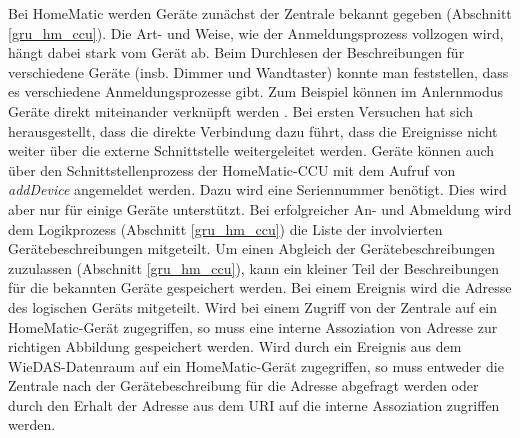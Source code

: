 Bei HomeMatic werden Geräte zunächst der Zentrale bekannt gegeben (Abschnitt \ref{gru_hm_ccu}).
Die Art- und Weise, wie der Anmeldungsprozess vollzogen wird, hängt dabei stark vom Gerät ab.
Beim Durchlesen der Beschreibungen für verschiedene Geräte (insb. Dimmer und Wandtaster)
konnte man feststellen, dass es verschiedene Anmeldungsprozesse gibt.
Zum Beispiel können im Anlernmodus Geräte direkt miteinander verknüpft werden \cite[Seite 6]{hmdimmer}.
Bei ersten Versuchen hat sich herausgestellt, dass die direkte Verbindung dazu führt, dass
die Ereignisse nicht weiter über die externe Schnittstelle weitergeleitet werden.
Geräte können auch über den Schnittstellenprozess der HomeMatic-CCU mit dem Aufruf von \emph{addDevice}
\cite[Seite 16]{homematic_webui_manual} angemeldet werden.
Dazu wird eine Seriennummer benötigt.
Dies wird aber nur für einige Geräte unterstützt.
Bei erfolgreicher An- und Abmeldung wird dem Logikprozess (Abschnitt \ref{gru_hm_ccu}) die Liste
der involvierten Gerätebeschreibungen mitgeteilt.
Um einen Abgleich der Gerätebeschreibungen zuzulassen (Abschnitt \ref{gru_hm_ccu}),
kann ein kleiner Teil der Beschreibungen für die bekannten Geräte gespeichert werden.
Bei einem Ereignis wird die Adresse des logischen Geräts mitgeteilt.
Wird bei einem Zugriff von der Zentrale auf ein HomeMatic-Gerät zugegriffen, so muss eine interne
Assoziation von Adresse zur richtigen Abbildung gespeichert werden.
Wird durch ein Ereignis aus dem WieDAS-Datenraum auf ein HomeMatic-Gerät
zugegriffen, so muss entweder die Zentrale nach der Gerätebeschreibung für die Adresse abgefragt werden
oder durch den Erhalt der Adresse aus dem URI auf die interne Assoziation zugriffen werden.

